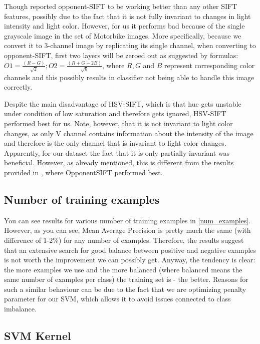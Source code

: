 \documentclass{article}
\begin{document}
Though \cite{colorspaces} reported opponent-SIFT to be working better than any other SIFT features, possibly due to the fact that it is not fully invariant to changes in light intensity and light color. However, for us it performs bad because of the single grayscale image in the set of Motorbike images. More specifically, because we convert it to 3-channel image by replicating its single channel, when converting to opponent-SIFT, first two layers will be zeroed out as suggested by formulas: $O1 = \frac{(R-G)}{\sqrt{2}}; O2 = \frac{(R+G-2B)}{\sqrt{6}}$, where $R, G$ and $B$ represent corresponding color channels and this possibly results in classifier not being able to handle this image correctly. 

Despite the main disadvantage of HSV-SIFT, which is that hue gets unstable under condition of low saturation and therefore gets ignored, HSV-SIFT performed best for us. Note, however, that it is not invariant to light color changes, as only V channel contains information about the intensity of the image and therefore is the only channel that is invariant to light color changes. Apparently, for our dataset the fact that it is only partially invariant was beneficial. However, as already mentioned, this is different from the results provided in \cite{colorspaces}, where OpponentSIFT performed best.

\subsection{Number of training examples}

You can see results for various number of training examples in \cref{num_examples}. However, as you can see, Mean Average Precision is pretty much the same (with difference of 1-2\%) for any number of examples. Therefore, the results suggest that an extensive search for good balance between positive and negative examples is not worth the improvement we can possibly get. Anyway, the tendency is clear: the more examples we use and the more balanced (where balanced means the same number of examples per class) the training set is - the better.
Reasons for such a similar behaviour can be due to the fact that we are optimizing penalty parameter for our SVM, which allows it to avoid issues connected to class imbalance. 

\subsection{SVM Kernel}
\end{document}
